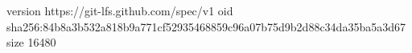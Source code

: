 version https://git-lfs.github.com/spec/v1
oid sha256:84b8a3b532a818b9a771cf52935468859c96a07b75d9b2d88c34da35ba5a3d67
size 16480
